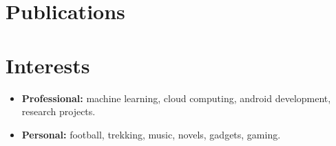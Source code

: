 \documentclass[]{friggeri-cv} %
\begin{document}



\section{Publications}




\section{Interests}

\begin{itemize}
\item \textbf{Professional:} machine learning, cloud computing, android development, research projects. 
\item \textbf{Personal:} football, trekking, music, novels, gadgets, gaming.\end{itemize}


%



\end{document}

